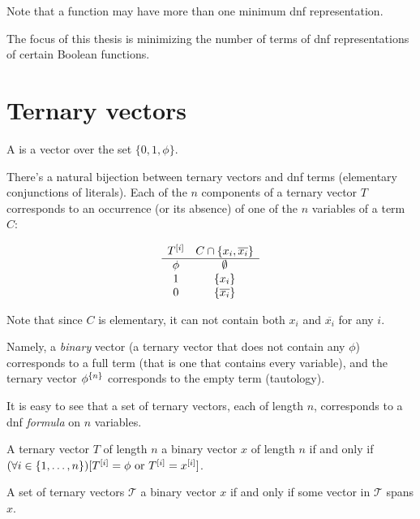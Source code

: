 Note that a function may have more than one minimum
\acrshort{dnf} representation.

The focus of this thesis is
minimizing the number of terms
of \acrshort{dnf} representations
of certain Boolean functions.

\section{Ternary vectors}

\begin{definition}
A 
is a vector over the set
$\{0, 1, \phi\}$.
\end{definition}

There's a natural bijection between ternary vectors
and \acrshort{dnf} terms
(elementary conjunctions of literals).
Each of the $n$ components of a ternary vector $T$
corresponds to an occurrence (or its absence)
of one of the $n$ variables of a term $C$:
\begin{center}
$$\begin{array}{cc}
T^{[i]} & C \cap \{x_i, \overline{x_i}\} \\
\hline
\phi & \emptyset \\
1 & \{x_i\} \\
0 & \{\overline{x_i}\}
\end{array}$$
\end{center}

Note that since $C$ is elementary,
it can not contain both $x_i$ and $\overline{x_i}$
for any $i$.

Namely,
a \emph{binary} vector
(a ternary vector that does not contain any $\phi$)
corresponds to a full term
(that is one that contains every variable),
and the ternary vector $\phi^{\{n\}}$
corresponds to the empty term (tautology).

It is easy to see that a set of ternary vectors,
each of length $n$,
corresponds to a \acrshort{dnf} \emph{formula}
on $n$ variables.

\begin{definition}
\label{def:spans}
A ternary vector $T$ of length $n$ 
a binary vector $x$ of length $n$
if and only if
$(\forall i \in \{1, \ldots, n\}) [T^{[i]} = \phi \text{ or } T^{[i]} = x^{[i]}]$.

A set of ternary vectors $\mathcal{T}$
a binary vector $x$
if and only if
some vector in $\mathcal{T}$ spans $x$.
\end{definition}

